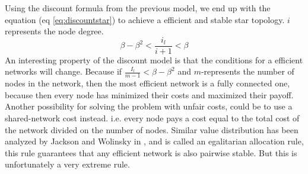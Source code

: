 Using the discount formula from the previous model, we end up with the equation (eq \ref{eq:discountstar}) to achieve a efficient and stable star topology. $i$ represents the node degree.
\begin{equation}
\beta-\beta^2<\frac{i_{l}}{i+1}< \beta
\label{eq:discountstar}
\end{equation}
An interesting property of the discount model is that the conditions for a efficient networks will change. Because
if $\frac{I_{l}}{m-1}<\beta-\beta^2$ and $m$-represents the number of nodes in the network, then the most efficient network is a fully connected one, because then every node has minimized their costs and maximized their payoff.
Another possibility for solving the problem with unfair costs, could be to use a shared-network cost instead. i.e. every node pays a cost equal to the total cost of the network divided on the number of nodes. 
Similar value distribution has been analyzed by Jackson and Wolinsky in \cite{jackson1996strategic}, and is called an egalitarian allocation rule, this rule guarantees that any efficient network is also pairwise stable. But this is unfortunately a very extreme rule.





